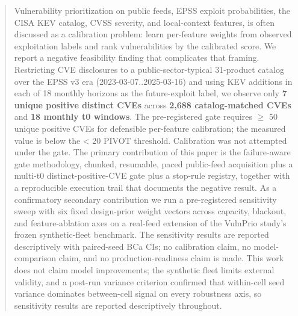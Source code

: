 \begin{abstract}
Vulnerability prioritization on public feeds, EPSS exploit probabilities, the CISA KEV catalog, CVSS severity, and local-context features, is often discussed as a calibration problem: learn per-feature weights from observed exploitation labels and rank vulnerabilities by the calibrated score. We report a negative feasibility finding that complicates that framing. Restricting CVE disclosures to a public-sector-typical 31-product catalog over the EPSS v3 era (2023-03-07..2025-03-16) and using KEV additions in each of 18 monthly horizons as the future-exploit label, we observe only \textbf{7 unique positive distinct CVEs} across \textbf{2,688 catalog-matched CVEs} and \textbf{18 monthly t0 windows}. The pre-registered gate requires $\geq$ 50 unique positive CVEs for defensible per-feature calibration; the measured value is below the < 20 PIVOT threshold. Calibration was not attempted under the gate. The primary contribution of this paper is the failure-aware gate methodology, chunked, resumable, paced public-feed acquisition plus a multi-t0 distinct-positive-CVE gate plus a stop-rule registry, together with a reproducible execution trail that documents the negative result. As a confirmatory secondary contribution we run a pre-registered sensitivity sweep with six fixed design-prior weight vectors across capacity, blackout, and feature-ablation axes on a real-feed extension of the VulnPrio study's frozen synthetic-fleet benchmark. The sensitivity results are reported descriptively with paired-seed BCa CIs; no calibration claim, no model-comparison claim, and no production-readiness claim is made. This work does not claim model improvements; the synthetic fleet limits external validity, and a post-run variance criterion confirmed that within-cell seed variance dominates between-cell signal on every robustness axis, so sensitivity results are reported descriptively throughout.
\end{abstract}
